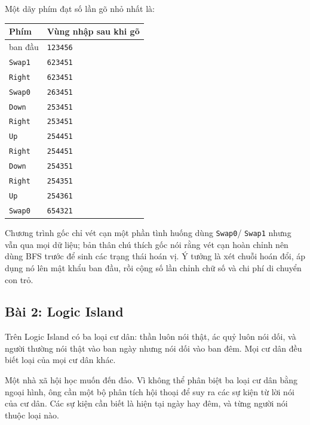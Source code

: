 \documentclass[11pt]{article}
\begin{document}
Một dãy phím đạt số lần gõ nhỏ nhất là:
\begin{center}
\begin{tabular}{ll}
\textbf{Phím} & \textbf{Vùng nhập sau khi gõ}\\
\hline
ban đầu & \texttt{123456}\\
\texttt{Swap1} & \texttt{623451}\\
\texttt{Right} & \texttt{623451}\\
\texttt{Swap0} & \texttt{263451}\\
\texttt{Down} & \texttt{253451}\\
\texttt{Right} & \texttt{253451}\\
\texttt{Up} & \texttt{254451}\\
\texttt{Right} & \texttt{254451}\\
\texttt{Down} & \texttt{254351}\\
\texttt{Right} & \texttt{254351}\\
\texttt{Up} & \texttt{254361}\\
\texttt{Swap0} & \texttt{654321}
\end{tabular}
\end{center}

Chương trình gốc chỉ vét cạn một phần tình huống dùng \texttt{Swap0}/
\texttt{Swap1} nhưng vẫn qua mọi dữ liệu; bản thân chú thích gốc nói rằng vét
cạn hoàn chỉnh nên dùng BFS trước để sinh các trạng thái hoán vị. Ý tưởng là
xét chuỗi hoán đổi, áp dụng nó lên mật khẩu ban đầu, rồi cộng số lần chỉnh
chữ số và chi phí di chuyển con trỏ.

\subsection{Bài 2: Logic Island}

Trên Logic Island có ba loại cư dân: thần luôn nói thật, ác quỷ luôn nói dối,
và người thường nói thật vào ban ngày nhưng nói dối vào ban đêm. Mọi cư dân
đều biết loại của mọi cư dân khác.

Một nhà xã hội học muốn đến đảo. Vì không thể phân biệt ba loại cư dân bằng
ngoại hình, ông cần một bộ phân tích hội thoại để suy ra các sự kiện từ lời
nói của cư dân. Các sự kiện cần biết là hiện tại ngày hay đêm, và từng người
nói thuộc loại nào.
\end{document}
